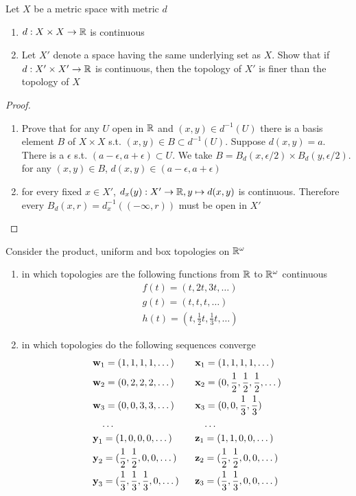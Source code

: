 \documentclass[11pt]{article}
\begin{document}
\begin{exercise}
Let \(X\) be a metric space with metric \(d\)
\begin{enumerate}
\item \(d:X\times X\to\mathbb{R}\) is continuous
\item Let \(X'\) denote a space having the same underlying set as \(X\). Show that if \(d:X'\times X'\to\mathbb{R}\)
is continuous, then the topology of \(X'\) is finer than the topology of \(X\)
\end{enumerate}
\end{exercise}

\begin{proof}
\begin{enumerate}
\item Prove that for any \(U\) open in \(\mathbb{R}\) and \((x,y)\in d^{-1}(U)\) there is a basis element \(B\)
of \(X\times X\) s.t. \((x,y)\in B\subset d^{-1}(U)\). Suppose \(d(x,y)=a\). There is a \(\epsilon\)
s.t. \((a-\epsilon,a+\epsilon)\subset U\). We take \(B=B_d(x,\epsilon/2)\times B_d(y,\epsilon/2)\). for
any \((x,y)\in B\), \(d(x,y)\in(a-\epsilon,a+\epsilon)\)
\item for every fixed \(x\in X'\), \(d_x(y):X'\to\mathbb{R},y\mapsto d(x,y)\) is continuous. Therefore every
\(B_d(x,r)=d_x^{-1}((-\infty,r))\) must be open in \(X'\)
\end{enumerate}
\end{proof}

\begin{exercise}
\label{ex20.4}
Consider the product, uniform and box topologies on \(\mathbb{R}^\omega\)
\begin{enumerate}
\item in which topologies are the following functions from \(\mathbb{R}\) to \(\mathbb{R}^\omega\) continuous
\begin{align*}
&f(t)=(t,2t,3t,\dots)\\
&g(t)=(t,t,t,\dots)\\
&h(t)=(t,\frac{1}{2}t,\frac{1}{3}t,\dots)
\end{align*}
\item in which topologies do the following sequences converge
\begin{alignat*}{2}
&\operatorname{\textbf{w}}_1=(1,1,1,1,\dots)&&\operatorname{\textbf{x}}_1=(1,1,1,1,\dots)\\
&\operatorname{\textbf{w}}_2=(0,2,2,2,\dots)&&\operatorname{\textbf{x}}_2=(0,\frac{1}{2},\frac{1}{2},\frac{1}{2},\dots)\\
&\operatorname{\textbf{w}}_3=(0,0,3,3,\dots)\quad&&\operatorname{\textbf{x}}_3=(0,0,\frac{1}{3},\frac{1}{3})\\
&\quad\dots&&\quad\dots\\
&\operatorname{\textbf{y}}_1=(1,0,0,0,\dots)&&\operatorname{\textbf{z}}_1=(1,1,0,0,\dots)\\
&\operatorname{\textbf{y}}_2=(\frac{1}{2},\frac{1}{2},0,0,\dots)&&\operatorname{\textbf{z}}_2=(\frac{1}{2},\frac{1}{2},0,0,\dots)\\
&\operatorname{\textbf{y}}_3=(\frac{1}{3},\frac{1}{3},\frac{1}{3},0,\dots)&&\operatorname{\textbf{z}}_3=(\frac{1}{3},\frac{1}{3},0,0,\dots)
\end{alignat*}
\end{enumerate}
\end{exercise}
\end{document}
